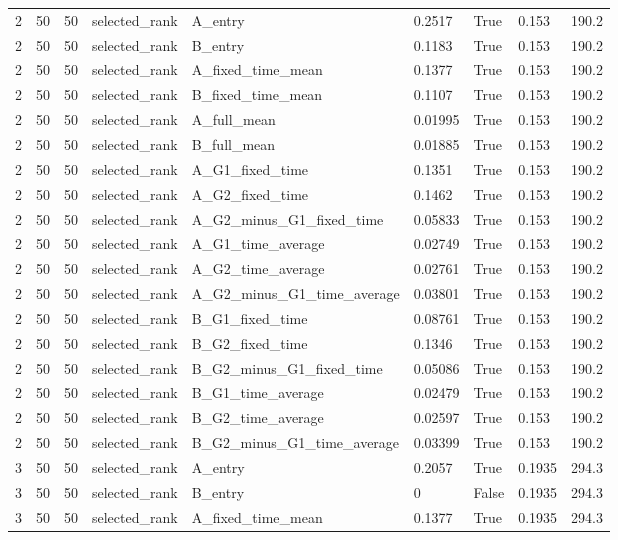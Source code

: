 \begin{longtable}{lllllllll}
2 & 50 & 50 & selected\_rank & A\_entry & 0.2517 & True & 0.153 & 190.2 \\
2 & 50 & 50 & selected\_rank & B\_entry & 0.1183 & True & 0.153 & 190.2 \\
2 & 50 & 50 & selected\_rank & A\_fixed\_time\_mean & 0.1377 & True & 0.153 & 190.2 \\
2 & 50 & 50 & selected\_rank & B\_fixed\_time\_mean & 0.1107 & True & 0.153 & 190.2 \\
2 & 50 & 50 & selected\_rank & A\_full\_mean & 0.01995 & True & 0.153 & 190.2 \\
2 & 50 & 50 & selected\_rank & B\_full\_mean & 0.01885 & True & 0.153 & 190.2 \\
2 & 50 & 50 & selected\_rank & A\_G1\_fixed\_time & 0.1351 & True & 0.153 & 190.2 \\
2 & 50 & 50 & selected\_rank & A\_G2\_fixed\_time & 0.1462 & True & 0.153 & 190.2 \\
2 & 50 & 50 & selected\_rank & A\_G2\_minus\_G1\_fixed\_time & 0.05833 & True & 0.153 & 190.2 \\
2 & 50 & 50 & selected\_rank & A\_G1\_time\_average & 0.02749 & True & 0.153 & 190.2 \\
2 & 50 & 50 & selected\_rank & A\_G2\_time\_average & 0.02761 & True & 0.153 & 190.2 \\
2 & 50 & 50 & selected\_rank & A\_G2\_minus\_G1\_time\_average & 0.03801 & True & 0.153 & 190.2 \\
2 & 50 & 50 & selected\_rank & B\_G1\_fixed\_time & 0.08761 & True & 0.153 & 190.2 \\
2 & 50 & 50 & selected\_rank & B\_G2\_fixed\_time & 0.1346 & True & 0.153 & 190.2 \\
2 & 50 & 50 & selected\_rank & B\_G2\_minus\_G1\_fixed\_time & 0.05086 & True & 0.153 & 190.2 \\
2 & 50 & 50 & selected\_rank & B\_G1\_time\_average & 0.02479 & True & 0.153 & 190.2 \\
2 & 50 & 50 & selected\_rank & B\_G2\_time\_average & 0.02597 & True & 0.153 & 190.2 \\
2 & 50 & 50 & selected\_rank & B\_G2\_minus\_G1\_time\_average & 0.03399 & True & 0.153 & 190.2 \\
3 & 50 & 50 & selected\_rank & A\_entry & 0.2057 & True & 0.1935 & 294.3 \\
3 & 50 & 50 & selected\_rank & B\_entry & 0 & False & 0.1935 & 294.3 \\
3 & 50 & 50 & selected\_rank & A\_fixed\_time\_mean & 0.1377 & True & 0.1935 & 294.3 \\

\end{longtable}
